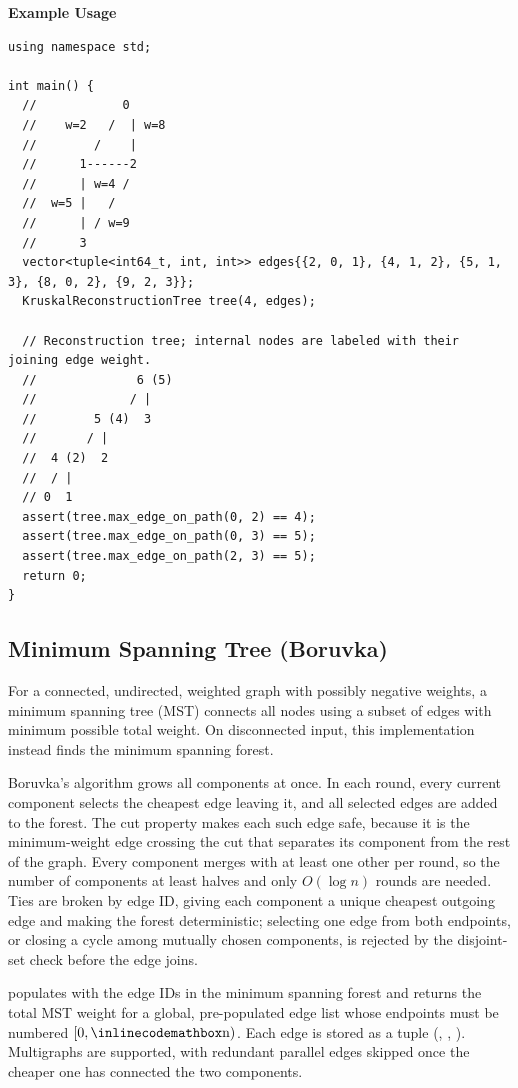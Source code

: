 \textbf{Example Usage}\par
\begin{lstlisting}[style=cpp]
using namespace std;

int main() {
  //            0
  //    w=2   /  | w=8
  //        /    |
  //      1------2
  //      | w=4 /
  //  w=5 |   /
  //      | / w=9
  //      3
  vector<tuple<int64_t, int, int>> edges{{2, 0, 1}, {4, 1, 2}, {5, 1, 3}, {8, 0, 2}, {9, 2, 3}};
  KruskalReconstructionTree tree(4, edges);

  // Reconstruction tree; internal nodes are labeled with their joining edge weight.
  //              6 (5)
  //             / |
  //        5 (4)  3
  //       / |
  //  4 (2)  2
  //  / |
  // 0  1
  assert(tree.max_edge_on_path(0, 2) == 4);
  assert(tree.max_edge_on_path(0, 3) == 5);
  assert(tree.max_edge_on_path(2, 3) == 5);
  return 0;
}
\end{lstlisting}
\subsection{Minimum Spanning Tree (Boruvka)}
\label{sec:4.4.4}
For a connected, undirected, weighted graph with possibly negative weights, a minimum spanning tree (MST) connects all nodes using a subset of edges with minimum possible total weight. On disconnected input, this implementation instead finds the minimum spanning forest.

Boruvka's algorithm grows all components at once. In each round, every current component selects the cheapest edge leaving it, and all selected edges are added to the forest. The cut property makes each such edge safe, because it is the minimum-weight edge crossing the cut that separates its component from the rest of the graph. Every component merges with at least one other per round, so the number of components at least halves and only $O(\log n)$ rounds are needed. Ties are broken by edge ID, giving each component a unique cheapest outgoing edge and making the forest deterministic; selecting one edge from both endpoints, or closing a cycle among mutually chosen components, is rejected by the disjoint-set check before the edge joins.

\begin{compactitem}
  \item {} populates  with the edge IDs in the minimum spanning forest and returns the total MST weight for a global, pre-populated edge list  whose endpoints must be numbered $[0, {\inlinecodemath{n}})$. Each edge is stored as a tuple (, , ). Multigraphs are supported, with redundant parallel edges skipped once the cheaper one has connected the two components.
\end{compactitem}

